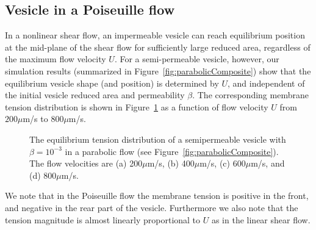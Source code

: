 \documentclass[9pt,twocolumn,twoside,lineno]{pnas-new}
\begin{document}
\subsection*{Vesicle in a Poiseuille flow}
In a nonlinear shear flow, an impermeable vesicle can reach equilibrium position at the mid-plane of the shear flow
for sufficiently large reduced area, regardless of the maximum flow velocity $U$. For a semi-permeable vesicle, however,
our simulation results (summarized in Figure~\ref{fig:parabolicComposite}) show that the equilibrium vesicle shape (and position) is determined by $U$, 
and independent of the initial vesicle reduced area and permeability $\beta$. The corresponding membrane tension distribution is shown in Figure~\ref{fig:parabolicTensions} as a function of flow velocity $U$ from $200\mu$m/s  to $800\mu$m/s.
\begin{figure}[hbp]
  \centering
  \caption{\label{fig:parabolicTensions} The equilibrium tension
  distribution of a semipermeable vesicle with $\beta=10^{-3}$ in a parabolic
  flow (see Figure~\ref{fig:parabolicComposite}). The flow velocities
  are (a) 200$\mu$m/s, (b) 400$\mu$m/s, (c) 600$\mu$m/s, and (d)
  800$\mu$m/s.}
\end{figure}

We note that in the Poiseuille flow the membrane tension is positive in the front, and negative in the rear part of the vesicle. Furthermore we also note that the tension magnitude is almost linearly proportional to $U$ as in the linear shear flow.
\end{document}
